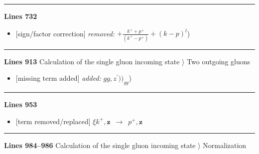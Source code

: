 \documentclass[10pt]{article}
\def\v#1{\mathbf{#1}}
\begin{document}
\noindent\rule{\linewidth}{0.3pt}\par\noindent\textbf{Lines 732} \par
\begin{itemize}[leftmargin=2.2em,itemsep=1pt,topsep=2pt]
\item[\textbf{l.732}] \textsf{\small [sign/factor correction]} \emph{removed:} $\displaystyle +$$\displaystyle \frac{k^{+}+p^{+}}{(k^{+}-p^{+})}+(k-p)^{l}${\color{gray}\small)}
\end{itemize}
\noindent\rule{\linewidth}{0.3pt}\par\noindent\textbf{Lines 913} \quad \textsf{Calculation of the single gluon incoming state $\rangle$ Two outgoing gluons} \par
\begin{itemize}[leftmargin=2.2em,itemsep=1pt,topsep=2pt]
\item[\textbf{l.913}] \textsf{\small [missing term added]} \emph{added:} $\displaystyle gg$$\displaystyle ,z^{\prime}))_{gg}${\color{gray}\small)}
\end{itemize}
\par
{}\par
{}\noindent\rule{\linewidth}{0.3pt}\par\noindent\textbf{Lines 953} \par
\begin{itemize}[leftmargin=2.2em,itemsep=1pt,topsep=2pt]
\item[\textbf{l.953}] \textsf{\small [term removed/replaced]} $\displaystyle \xi k^+,\v{z}$\ $\longrightarrow$\ $\displaystyle p^+,\v{z}$
\end{itemize}
\noindent\rule{\linewidth}{0.3pt}\par\noindent\textbf{Lines 984--986} \quad \textsf{Calculation of the single gluon incoming state $\rangle$ Normalization}\par
\end{document}
